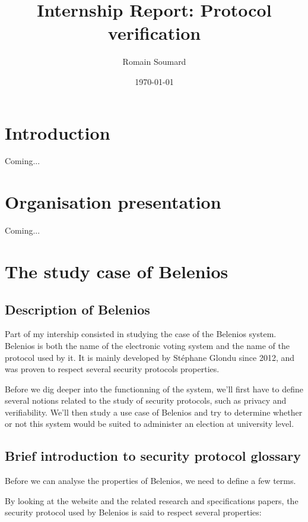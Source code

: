 \documentclass[12pt, a4paper]{report}
\title{\color{blue}Internship Report: Protocol verification}
\author{Romain Soumard}
\date{\today}
\begin{document}
\maketitle

\section{Introduction}

Coming...

\section{Organisation presentation}

Coming...

\section{The study case of Belenios}

\subsection{Description of Belenios}

Part of my intership consisted in studying the case of the Belenios system.
Belenios is both the name of the electronic voting system and the name of the protocol used by it.
It is mainly developed by Stéphane Glondu since 2012, and was proven to respect several security protocols properties.

Before we dig deeper into the functionning of the system, we'll first have to define several notions related to the study of security protocols, such as privacy and verifiability.
We'll then study a use case of Belenios and try to determine whether or not this system would be suited to administer an election at university level.

\subsection{Brief introduction to security protocol glossary}

Before we can analyse the properties of Belenios, we need to define a few terms.

By looking at the website and the related research and specifications papers, the security protocol used by Belenios is said to respect several properties:
\end{document}
